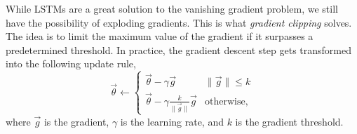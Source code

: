 While LSTMs are a great solution to the vanishing gradient problem, we still have the possibility
of exploding gradients. This is what \textit{gradient clipping} solves. The idea is to limit the
maximum value of the gradient if it surpasses a predetermined threshold. In practice, the gradient
descent step gets transformed into the following update rule, \[
    \vec{\theta} \gets \begin{cases}
        \vec{\theta} - \gamma \vec{g}                         & \| \vec{g} \| \leq k \\
        \vec{\theta} - \gamma \frac{k}{\| \vec{g} \|} \vec{g} & \text{otherwise},
    \end{cases}
\]
where $\vec{g}$ is the gradient, $\gamma$ is the learning rate, and $k$ is the gradient threshold.
